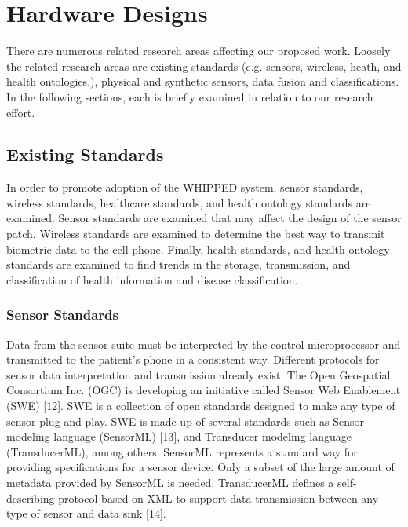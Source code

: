 
\chapter{Hardware Designs}

There are numerous related research areas affecting our proposed work. Loosely the related research areas are existing standards (e.g. sensors, wireless, heath, and health ontologies.), physical and synthetic sensors, data fusion and classifications. In the following sections, each is briefly examined in relation to our research effort.



\section{Existing Standards}
In order to promote adoption of the WHIPPED system, sensor standards, wireless standards, healthcare standards, and health ontology standards are examined. Sensor standards are examined that may affect the design of the sensor patch. Wireless standards are examined to determine the best way to transmit biometric data to the cell phone. Finally, health standards, and health ontology standards are examined to find trends in the storage, transmission, and classification of health information and disease classification.
\subsection{Sensor Standards}

Data from the sensor suite must be interpreted by the control microprocessor and transmitted to the patient’s phone in a consistent way. Different protocols for sensor data interpretation and transmission already exist.  The Open Geospatial Consortium Inc. (OGC) is developing an initiative called Sensor Web Enablement (SWE) [12]. SWE is a collection of open standards designed to make any type of sensor plug and play. SWE is made up of several standards such as Sensor modeling language (SensorML) [13], and Transducer modeling language (TransducerML), among others. SensorML represents a standard way for providing specifications for a sensor device. Only a subset of the large amount of metadata provided by SensorML is needed. TransducerML defines a self-describing protocol based on XML to support data transmission between any type of sensor and data sink [14].

